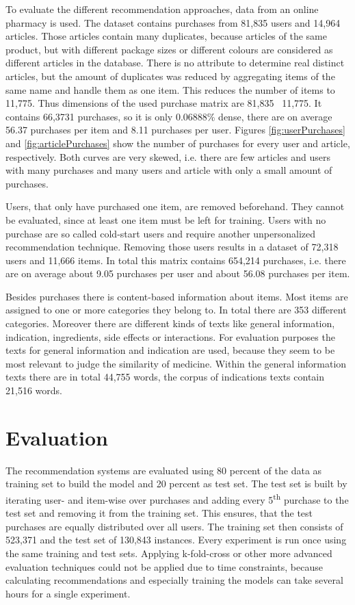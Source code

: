 \documentclass[10pt]{reportMaster}
\begin{document}
To evaluate the different recommendation approaches, data from an online pharmacy is used.
The dataset contains purchases from 81,835 users and 14,964 articles.
Those articles contain many duplicates, because articles of the same product, but with different package sizes or different colours are considered as different articles in the database.
There is no attribute to determine real distinct articles, but the amount of duplicates was reduced by aggregating items of the same name and handle them as one item.
This reduces the number of items to 11,775.
Thus dimensions of the used purchase matrix are 81,835 \texttimes \ 11,775.
It contains 66,3731 purchases, so it is only 0.06888\% dense, there are on average 56.37 purchases per item and 8.11 purchases per user. %
Figures \ref{fig:userPurchases} and \ref{fig:articlePurchases} show the number of purchases for every user and article, respectively.
Both curves are very skewed, i.e. there are few articles and users with many purchases and many users and article with only a small amount of purchases.

Users, that only have purchased one item, are removed beforehand.
They cannot be evaluated, since at least one item must be left for training.
Users with no purchase are so called cold-start users and require another unpersonalized recommendation technique.
Removing those users results in a dataset of 72,318 users and 11,666 items.
In total this matrix contains 654,214 purchases, i.e. there are on average about 9.05 purchases per user and about 56.08 purchases per item.

Besides purchases there is content-based information about items.
Most items are assigned to one or more categories they belong to.
In total there are 353 different categories.
Moreover there are different kinds of texts like general information, indication, ingredients, side effects or interactions.
For evaluation purposes the texts for general information and indication are used, because they seem to be most relevant to judge the similarity of medicine.
Within the general information texts there are in total 44,755 words, the corpus of indications texts contain 21,516 words.


 \section{Evaluation}
\label{sec:eval}
The recommendation systems are evaluated using 80 percent of the data as training set to build the model and 20 percent as test set.
The test set is built by iterating user- and item-wise over purchases and adding every 5\textsuperscript{th} purchase to the test set and removing it from the training set.
This ensures, that the test purchases are equally distributed over all users.
The training set then consists of 523,371 and the test set of 130,843 instances.
Every experiment is run once using the same training and test sets.
Applying k-fold-cross or other more advanced evaluation techniques could not be applied due to time constraints, because calculating recommendations and especially training the models can take several hours for a single experiment.
\end{document}
